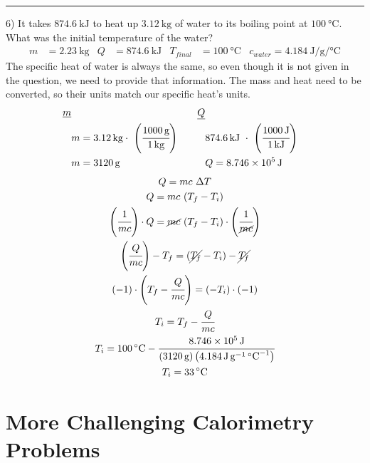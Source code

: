 \documentclass[12pt, oneside, letterpaper]{book}
\begin{document}
\hrule

6) It takes $\qty{874.6}{\kilo\joule}$ to heat up $\qty{3.12}{\kilo\gram}$ of water to its boiling point at $\qty{100}{\degreeCelsius}$. What was the initial temperature of the water?
\begin{align*}
 m &= \qty{2.23}{\kilo\gram}  
    & Q &=\qty{874.6}{\kilo\joule} 
    & T_{final} &= \qty{100}{\degreeCelsius} 
    & c_{water} = \qty{4.184}{\joule\per\gram\per\degreeCelsius} 
\end{align*}
The specific heat of water is always the same, so even though it is not given in the question, we need to provide that information. The mass and heat need to be converted, so their units match our specific heat's units. 
\begin{align*}
    \underline{m} 
    &&&& \underline{Q} 
    \\
    & m = \qty{3.12}{\cancel{\kilo\gram}} 
        \cdot\  \left(\cfrac{\qty{1000}{\gram}}{\qty{1}{\cancel{\kilo\gram}}} \right) 
    &&&& \qty{874.6}{\cancel{\kilo\joule}}\  
        \cdot\  \left(\cfrac{\qty{1000}{\joule}}{\qty{1}{\cancel{\kilo\joule}}} \right)
    \\
    & m= \qty{3120}{\gram} 
    &&&& Q= \qty{8.746e5}{\joule}  
\end{align*}
\begin{gather*}
    Q=mc\ \Delta T 
    \\
    Q = mc\ (T_f - T_i) 
    \\
    \left(\cfrac{1}{mc} \right) \cdot Q =
        \cancel{mc}\ (T_f - T_i) \cdot 
        \left(\cfrac{1}{\cancel{mc}} \right)
    \\
     \left(\cfrac{Q}{mc} \right) - T_f = 
        (\cancel{T_f} - T_i) - \cancel{T_f}
    \\
    (-1) \cdot \left(T_f - \cfrac{Q}{mc} \right) = 
    (- T_i) \cdot (-1)
    \\
    T_i = T_f - \cfrac{Q}{mc}
    \\
    T_i = \qty{100}{\degreeCelsius} - 
        \cfrac{\qty{8.746e5}{\joule}}
        {(\qty{3120}{\gram}) 
        \left(\qty{4.184}{\joule\per\gram\per\degreeCelsius} \right)}
    \\
    T_i = \qty{33}{\degreeCelsius}
\end{gather*}

\newpage

\section{More Challenging Calorimetry Problems}
\end{document}

